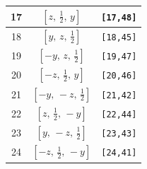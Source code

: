 \documentclass[fleqn,8pt]{jsarticle}
\begin{document}
\begin{longtable}{ccc}
17 & $\left[ z,\, \frac{1}{2},\, y \right]$ & {\tt [17,48]} \\ \hline
18 & $\left[ y,\, z,\, \frac{1}{2} \right]$ & {\tt [18,45]} \\ \hline
19 & $\left[ - y,\, z,\, \frac{1}{2} \right]$ & {\tt [19,47]} \\ \hline
20 & $\left[ - z,\, \frac{1}{2},\, y \right]$ & {\tt [20,46]} \\ \hline
21 & $\left[ - y,\, - z,\, \frac{1}{2} \right]$ & {\tt [21,42]} \\ \hline
22 & $\left[ z,\, \frac{1}{2},\, - y \right]$ & {\tt [22,44]} \\ \hline
23 & $\left[ y,\, - z,\, \frac{1}{2} \right]$ & {\tt [23,43]} \\ \hline
24 & $\left[ - z,\, \frac{1}{2},\, - y \right]$ & {\tt [24,41]} \\
\end{longtable}
\renewcommand{\arraystretch}{1.2}
\end{document}
